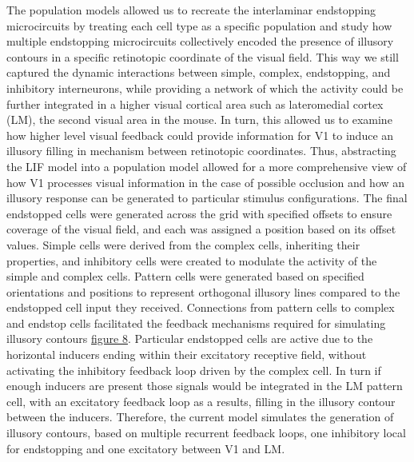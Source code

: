 \documentclass[12pt]{article}
\begin{document}
The population models allowed us to recreate the interlaminar endstopping microcircuits by treating each cell type as a specific population and study how multiple endstopping microcircuits collectively encoded the presence of illusory contours in a specific retinotopic coordinate of the visual field. This way we still captured the dynamic interactions between simple, complex, endstopping, and inhibitory interneurons, while providing a network of which the activity could be further integrated in a higher visual cortical area such as lateromedial cortex (LM), the second visual area in the mouse. In turn, this allowed us to examine how higher level visual feedback could provide information for V1 to induce an illusory filling in mechanism between retinotopic coordinates. Thus, abstracting the LIF model into a population model allowed for a more comprehensive view of how V1 processes visual information in the case of possible occlusion and how an illusory response can be generated to particular stimulus configurations. The final endstopped cells were generated across the grid with specified offsets to ensure coverage of the visual field, and each was assigned a position based on its offset values. Simple cells were derived from the complex cells, inheriting their properties, and inhibitory cells were created to modulate the activity of the simple and complex cells. Pattern cells were generated based on specified orientations and positions to represent orthogonal illusory lines compared to the endstopped cell input they received. Connections from pattern cells to complex and endstop cells facilitated the feedback mechanisms required for simulating illusory contours \hyperref[fig:illusory_filling]{figure 8}. Particular endstopped cells are active due to the horizontal inducers ending within their excitatory receptive field, without activating the inhibitory feedback loop driven by the complex cell. In turn if enough inducers are present those signals would be integrated in the LM pattern cell, with an excitatory feedback loop as a results, filling in the illusory contour between the inducers. Therefore, the current model simulates the generation of illusory contours, based on multiple recurrent feedback loops, one inhibitory local for endstopping and one excitatory between V1 and LM. 
\end{document}
